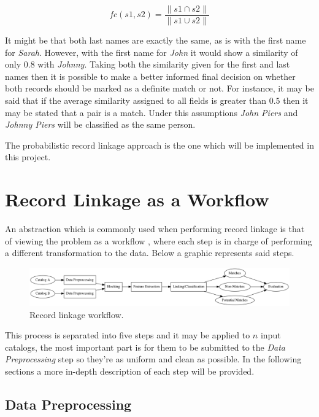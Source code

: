 \documentclass[epsfig,a4paper,11pt,titlepage,twoside,openany]{book}
\begin{document}
$$
fc(s1, s2) = \frac{\| s1 \cap s2 \|}{\| s1 \cup s2 \|}
$$


It might be that both last names are exactly the same, as is with the first name for
\textit{Sarah}. However, with the first name for \textit{John} it would show a similarity of only $0.8$ with \textit{Johnny}. Taking both the similarity given
for the first and last names then it is possible to make a better informed final decision on
whether both records should be marked as a definite match or not. 
For instance, it may be said that if the average similarity assigned to all fields is greater than $0.5$ then it may be stated that a pair is a match. Under this assumptions \textit{John Piers} and
\textit{Johnny Piers} will be classified as the same person.

The probabilistic record linkage approach is the one which will be implemented in this project.





\section{Record Linkage as a Workflow}
\label{sec:rl-as-a-workflow}

An abstraction which is commonly used when performing record linkage is that of viewing the problem as a workflow \cite{christen12_data}, where each step is in charge of performing a different transformation to the data. Below a graphic represents said steps.

\begin{figure}[H]
  \centering \includegraphics[width=\textwidth]{rl-workflow}
  \caption{Record linkage workflow.}
  \label{fig:rl-workflow}
\end{figure}

This process is separated into five steps and it may be applied to $n$ input catalogs, the most important part is for them to be submitted to the \textit{Data Preprocessing} step so they're as uniform and clean as possible. In the following sections a more in-depth description of each step will be provided.

\subsection{Data Preprocessing}
\label{sec:rl-workflow-data-preprocessing}
\end{document}
